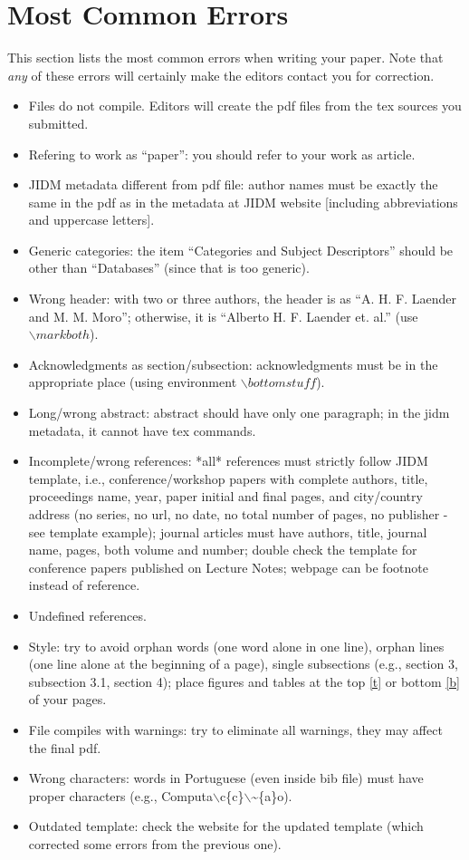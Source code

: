 \documentclass[jidm,a4paper]{jidm} %
\begin{document}
\section{Most Common Errors}

This section lists the most common errors when writing your paper. Note that \textit{any} of these errors will certainly make the editors contact you for correction.

\begin{itemize}
	\item Files do not compile. Editors will create the pdf files from the tex sources you submitted.
	\item Refering to work as ``paper'': you should refer to your work as article.
	\item JIDM metadata different from pdf file: author names must be exactly the same in the pdf as in the metadata at JIDM website [including abbreviations and uppercase letters].
	\item Generic categories: the item ``Categories and Subject Descriptors'' should be other than ``Databases'' (since that is too generic).
	\item Wrong header: with two or three authors, the header is as ``A. H. F. Laender and M. M. Moro''; otherwise, it is ``Alberto H. F. Laender et. al.'' (use $\backslash markboth$).
	\item Acknowledgments as section/subsection: acknowledgments must be in the appropriate place (using environment $\backslash bottomstuff$).
	\item Long/wrong abstract: abstract should have only one paragraph; in the jidm metadata, it cannot have tex commands.
	\item Incomplete/wrong references: *all* references must strictly follow JIDM template, i.e., conference/workshop papers with complete authors, title, proceedings name, year, paper initial and final pages, and city/country address (no series, no url, no date, no total number of pages, no publisher - see template example); journal articles must have authors, title, journal name, pages, both volume and number; double check the template for conference papers published on Lecture Notes; webpage can be footnote instead of reference.
	\item Undefined references.
	\item Style: try to avoid orphan words (one word alone in one line), orphan lines (one line alone at the beginning of a page), single subsections (e.g., section 3, subsection 3.1, section 4); place figures and tables at the top \url{[t]} or bottom \url{[b]} of your pages.
	\item File compiles with warnings: try to eliminate all warnings, they may affect the final pdf.
	\item Wrong characters: words in Portuguese (even inside bib file) must have proper characters (e.g., Computa$\backslash$c\{c\}$\backslash$\textasciitilde\{a\}o).
	\item Outdated template: check the website for the updated template (which corrected some errors from the previous one).
\end{itemize}
	



\begin{received}
\end{received}
\end{document}
